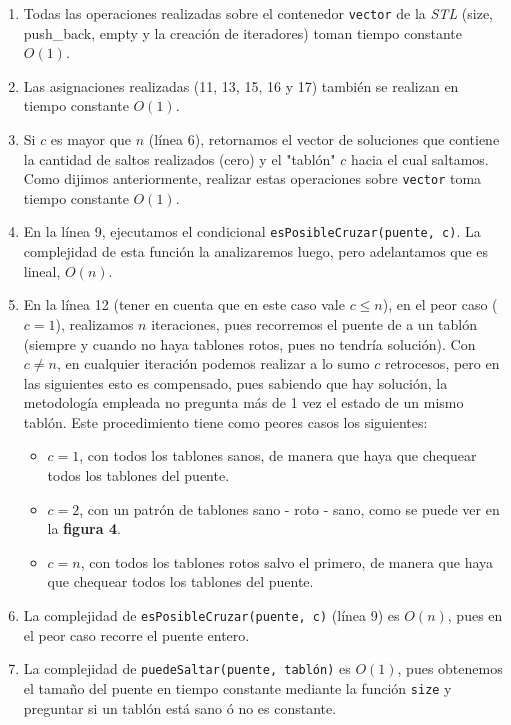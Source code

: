 \begin{enumerate}
  \item Todas las operaciones realizadas sobre el contenedor \verb|vector| de la \textit{STL} (size, push_back, empty y la creación de iteradores)
  toman tiempo constante $O(1)$.

  \item Las asignaciones realizadas (11, 13, 15, 16 y 17) también se realizan en tiempo constante $O(1)$.

  \item Si $c$ es mayor que $n$ (línea 6), retornamos el vector de soluciones que contiene la cantidad de saltos realizados (cero) y
  el "tablón" $c$ hacia el cual saltamos. Como dijimos anteriormente, realizar estas operaciones sobre \verb|vector|
  toma tiempo constante $O(1)$.

  \item En la línea 9, ejecutamos el condicional \verb|esPosibleCruzar(puente, c)|. La complejidad de esta función la
  analizaremos luego, pero adelantamos que es lineal, $O(n)$.

  \item En la línea 12 (tener en cuenta que en este caso vale $c \leq n$), en el peor caso ($c = 1$), realizamos $n$ iteraciones,
  pues recorremos el puente de a un tablón (siempre y cuando no haya tablones rotos, pues no tendría solución). Con $c \neq n$,
  en cualquier iteración podemos realizar a lo sumo $c$ retrocesos, pero en las siguientes esto es compensado, pues sabiendo que
  hay solución, la metodología empleada no pregunta más de 1 vez el estado de un mismo tablón. Este procedimiento tiene como peores
  casos los siguientes:
  \begin{itemize}
    \item $c = 1$, con todos los tablones sanos, de manera que haya que chequear todos los tablones del puente.

    \item $c = 2$, con un patrón de tablones sano - roto - sano, como se puede ver en la \textbf{figura 4}.

    \item $c = n$, con todos los tablones rotos salvo el primero, de manera que haya que chequear todos los tablones del puente.
  \end{itemize}

  \item La complejidad de \verb|esPosibleCruzar(puente, c)| (línea 9) es $O(n)$, pues en el peor caso recorre el puente entero.

  \item La complejidad de \verb|puedeSaltar(puente, tablón)| es $O(1)$, pues obtenemos el tamaño del puente en tiempo constante
  mediante la función \verb|size| y preguntar si un tablón está sano ó no es constante.

\end{enumerate}

